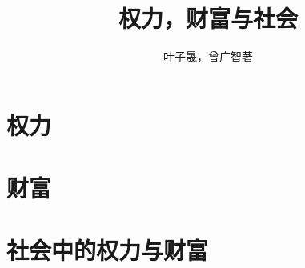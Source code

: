 \documentclass[12pt,heading=true]{book}
\begin{document}
\title{权力，财富与社会}
\author{叶子晟，曾广智\quad 著}
\date{}
\maketitle

\tableofcontents

\part{权力}



\part{财富}

\part{社会中的权力与财富}
\end{document}
